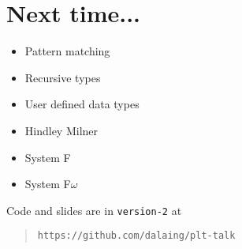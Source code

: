 
\section{Next time...}

\begin{frame}[c]
\begin{itemize}
\item<+-> Pattern matching
\item<+-> Recursive types
\item<+-> User defined data types
\item<+-> Hindley Milner
\item<+-> System F
\item<+-> System F$\omega$
\end{itemize}
\end{frame}

\begin{frame}[c]
  Code and slides are in {\tt version-2} at \\
  \begin{quote}
  {\tt https://github.com/dalaing/plt-talk}
  \end{quote}
\end{frame}
